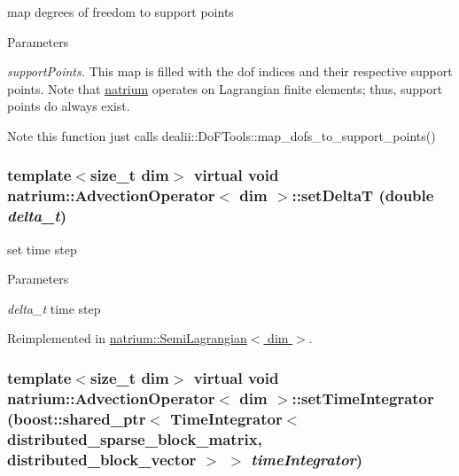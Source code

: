 map degrees of freedom to support points 
\begin{DoxyParams}{Parameters}
\item[{\em supportPoints.}]This map is filled with the dof indices and their respective support points. Note that \hyperlink{namespacenatrium}{natrium} operates on Lagrangian finite elements; thus, support points do always exist. \end{DoxyParams}
\begin{DoxyNote}{Note}
this function just calls dealii::DoFTools::map\_\-dofs\_\-to\_\-support\_\-points() 
\end{DoxyNote}
\hypertarget{classnatrium_1_1AdvectionOperator_a640db5be4d4930198124fa57752167e5}{
\subsubsection[{setDeltaT}]{\setlength{\rightskip}{0pt plus 5cm}template$<$size\_\-t dim$>$ virtual void {\bf natrium::AdvectionOperator}$<$ dim $>$::setDeltaT (double {\em delta\_\-t})}}
\label{classnatrium_1_1AdvectionOperator_a640db5be4d4930198124fa57752167e5}


set time step 
\begin{DoxyParams}{Parameters}
\item[{\em delta\_\-t}]time step \end{DoxyParams}


Reimplemented in \hyperlink{classnatrium_1_1SemiLagrangian_abd17b628b89c43303d067c0a4e4d0bf1}{natrium::SemiLagrangian$<$ dim $>$}.\hypertarget{classnatrium_1_1AdvectionOperator_aa93f60c7e7270a35df21387a962d7a38}{
\subsubsection[{setTimeIntegrator}]{\setlength{\rightskip}{0pt plus 5cm}template$<$size\_\-t dim$>$ virtual void {\bf natrium::AdvectionOperator}$<$ dim $>$::setTimeIntegrator (boost::shared\_\-ptr$<$ {\bf TimeIntegrator}$<$ distributed\_\-sparse\_\-block\_\-matrix, distributed\_\-block\_\-vector $>$ $>$ {\em timeIntegrator})}}
\label{classnatrium_1_1AdvectionOperator_aa93f60c7e7270a35df21387a962d7a38}


